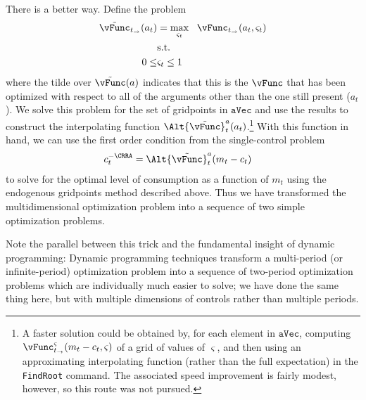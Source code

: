 \documentclass[titlepage, headings=optiontotocandhead]{Resources/texmf-local/tex/latex/econtex}
\begin{document}
There is a better way.  Define the problem
\providecommand{\Opt}{}
\renewcommand{\Opt}{\tilde}
\providecommand{\vOpt}{}
\renewcommand{\vOpt}{\overset{*}{\vFunc}}
\begin{equation}\begin{gathered}\begin{aligned}
      \Opt{\vFunc}_{{t_\rightarrow}}({a}_{t})  & = \max_{\varsigma_{t}} ~~  \vFunc_{t_\rightarrow}({a}_{t},\varsigma_{t})
      \\      & \text{s.t.} \nonumber
      \\      0 \leq & \varsigma_{t} \leq 1
    \end{aligned}\end{gathered}\end{equation}
where the tilde over $\Opt{\vFunc}(a)$ indicates that this is the $\vFunc$ that has been optimized with respect to all of the arguments other than the one still present (${a}_{t}$).  We solve this problem for the set of gridpoints in \ensuremath{\mathtt{aVec}} and use the results to construct the interpolating function $\Alt{\Opt{\vFunc}}_{t}^{a}({a}_{t})$.\footnote{A faster solution could be obtained by, for each element in \ensuremath{\mathtt{aVec}}, computing $\vFunc_{t_\rightarrow}^{\varsigma}({m}_{t}-{c}_{t},\varsigma)$ of a grid of values of $\varsigma$, and then using an approximating interpolating function (rather than the full expectation) in the \texttt{FindRoot} command.  The associated speed improvement is fairly modest, however, so this route was not pursued.}  With this function in hand, we can use the first order condition from the single-control problem
\begin{equation*}\begin{gathered}\begin{aligned}
      {c}_{t}^{-\CRRA}  & = \Alt{\Opt{\vFunc}}_{t}^{{a}}({m}_{t}-{c}_{t})
    \end{aligned}\end{gathered}\end{equation*}
to solve for the optimal level of consumption as a function of ${m}_{t}$ using the endogenous gridpoints method described above.  Thus we have transformed the multidimensional optimization problem into a sequence of two simple optimization problems.

Note the parallel between this trick and the fundamental insight of dynamic programming: Dynamic programming techniques transform a multi-period (or infinite-period) optimization problem into a sequence of two-period optimization problems which are individually much easier to solve; we have done the same thing here, but with multiple dimensions of controls rather than multiple periods.
\end{document}
